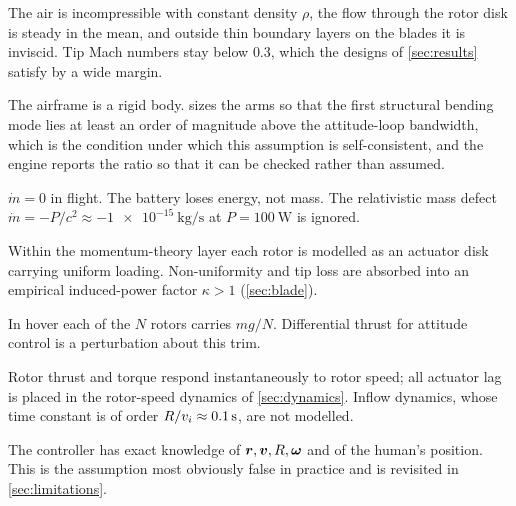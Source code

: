 \begin{assumption}
\label{as:flow}
The air is incompressible with constant density $\rho$, the flow through the
rotor disk is steady in the mean, and outside thin boundary layers on the
blades it is inviscid. Tip Mach numbers stay below $0.3$, which the designs of
\cref{sec:results} satisfy by a wide margin.
\end{assumption}

\begin{assumption}
\label{as:rigid}
The airframe is a rigid body.  sizes the arms so that the
first structural bending mode lies at least an order of magnitude above the
attitude-loop bandwidth, which is the condition under which this assumption is
self-consistent, and the engine reports the ratio so that it can be checked
rather than assumed.
\end{assumption}

\begin{assumption}
\label{as:mass}
$\dot m = 0$ in flight. The battery loses energy, not mass. The relativistic
mass defect $\dot m = -P/c^2 \approx \SI{-1e-15}{\kilo\gram\per\second}$ at
$P=\SI{100}{\watt}$ is ignored.
\end{assumption}

\begin{assumption}
\label{as:uniform}
Within the momentum-theory layer each rotor is modelled as an actuator disk
carrying uniform loading. Non-uniformity and tip loss are absorbed into an
empirical induced-power factor $\kappa>1$ (\cref{sec:blade}).
\end{assumption}

\begin{assumption}
\label{as:share}
In hover each of the $N$ rotors carries $mg/N$. Differential thrust for
attitude control is a perturbation about this trim.
\end{assumption}

\begin{assumption}
\label{as:quasisteady}
Rotor thrust and torque respond instantaneously to rotor speed; all actuator
lag is placed in the rotor-speed dynamics of \cref{sec:dynamics}. Inflow
dynamics, whose time constant is of order $R/v_i \approx \SI{0.1}{\second}$,
are not modelled.
\end{assumption}

\begin{assumption}
\label{as:estimation}
The controller has exact knowledge of $\bm{r},\bm{v},R,\bm{\omega}$ and
of the human's position. This is the assumption most obviously false in
practice and is revisited in \cref{sec:limitations}.
\end{assumption}

